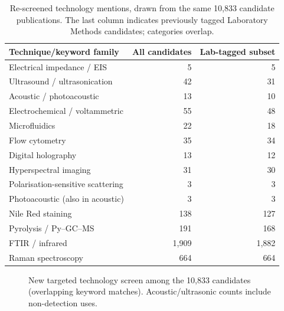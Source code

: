 \documentclass[10pt,a4paper]{article}
\begin{document}
\begin{table}[H]\centering\footnotesize
\caption{Re-screened technology mentions, drawn from the same 10,833 candidate publications. The last column indicates previously tagged Laboratory Methods candidates; categories overlap.}\label{tab:mentions}
\begin{tabular}{@{}lrr@{}}\toprule
Technique/keyword family & All candidates & Lab-tagged subset \\\midrule
Electrical impedance / EIS & 5 & 5 \\
Ultrasound / ultrasonication & 42 & 31 \\
Acoustic / photoacoustic & 13 & 10 \\
Electrochemical / voltammetric & 55 & 48 \\
Microfluidics & 22 & 18 \\
Flow cytometry & 35 & 34 \\
Digital holography & 13 & 12 \\
Hyperspectral imaging & 31 & 30 \\
Polarisation-sensitive scattering & 3 & 3 \\
Photoacoustic (also in acoustic) & 3 & 3 \\
Nile Red staining & 138 & 127 \\
Pyrolysis / Py--GC--MS & 191 & 168 \\
FTIR / infrared & 1,909 & 1,882 \\
Raman spectroscopy & 664 & 664 \\\bottomrule
\end{tabular}
\end{table}

\begin{figure}[H]\centering
{}
\caption{New targeted technology screen among the 10,833 candidates (overlapping keyword matches). Acoustic/ultrasonic counts include non-detection uses.}\label{fig:emerging}
\end{figure}
\end{document}
